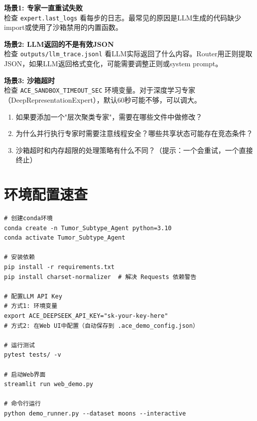 \documentclass[11pt,a4paper]{ctexbook}
\begin{document}
\begin{tipbox}
    \textbf{场景1: 专家一直重试失败}\\
    检查 \texttt{expert.last\_logs} 看每步的日志。最常见的原因是LLM生成的代码缺少import或使用了沙箱禁用的内置函数。
\end{tipbox}

\begin{tipbox}
    \textbf{场景2: LLM返回的不是有效JSON}\\
    检查 \texttt{outputs/llm\_trace.jsonl} 看LLM实际返回了什么内容。Router用正则提取JSON，如果LLM返回格式变化，可能需要调整正则或system prompt。
\end{tipbox}

\begin{tipbox}
    \textbf{场景3: 沙箱超时}\\
    检查 \texttt{ACE\_SANDBOX\_TIMEOUT\_SEC} 环境变量。对于深度学习专家（DeepRepresentationExpert），默认60秒可能不够，可以调大。
\end{tipbox}

\begin{reviewbox}
    \begin{enumerate}
        \item 如果要添加一个"层次聚类专家"，需要在哪些文件中做修改？
        \item 为什么并行执行专家时需要注意线程安全？哪些共享状态可能存在竞态条件？
        \item 沙箱超时和内存超限的处理策略有什么不同？（提示：一个会重试，一个直接终止）
    \end{enumerate}
\end{reviewbox}

\appendix
\chapter{环境配置速查}

\begin{verbatim}
# 创建conda环境
conda create -n Tumor_Subtype_Agent python=3.10
conda activate Tumor_Subtype_Agent

# 安装依赖
pip install -r requirements.txt
pip install charset-normalizer  # 解决 Requests 依赖警告

# 配置LLM API Key
# 方式1: 环境变量
export ACE_DEEPSEEK_API_KEY="sk-your-key-here"
# 方式2: 在Web UI中配置（自动保存到 .ace_demo_config.json）

# 运行测试
pytest tests/ -v

# 启动Web界面
streamlit run web_demo.py

# 命令行运行
python demo_runner.py --dataset moons --interactive
\end{verbatim}
\end{document}
